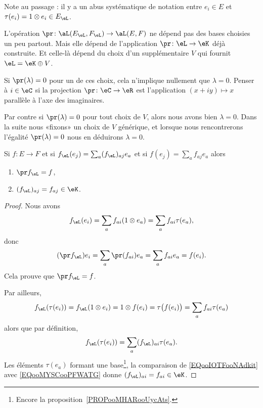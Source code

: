 Note au passage : il y a un abus systématique de notation entre \( e_i\in E\) et \( \tau(e_i)=1\otimes e_i\in E_{\eL}\).

\begin{remark}       \label{REMooBEXGooLgpHzg}
	L'opération \( \pr\colon \aL(E_{\eL},F_{\eL})\to \aL(E,F)\) ne dépend pas des bases choisies un peu partout. Mais elle dépend de l'application \( \pr\colon \eL\to \eK\) déjà construite. Et celle-là dépend du choix d'un supplémentaire \( V\) qui fournit \( \eL=\eK\oplus V\).

	Si \( \pr(\lambda)=0\) pour un de ces choix, cela n'implique nullement que \( \lambda=0\). Penser à \( i\in \eC\) si la projection \( \pr\colon \eC\to \eR\) est l'application \( (x+iy)\mapsto x\) parallèle à l'axe des imaginaires.

	Par contre si \( \pr(\lambda)=0\) pour tout choix de \( V\), alors nous avons bien \( \lambda=0\). Dans la suite nous «fixons» un choix de \( V\) générique, et lorsque nous rencontrerons l'égalité \( \pr(\lambda)=0\) nous en déduirons \( \lambda=0\).
\end{remark}

\begin{proposition} \label{PROPooPWDKooFNFWRI}
	Si \( f\colon E\to F\) et si \( f_{\eL}(e_j)=\sum_a(f_{\eL})_{aj}e_a\) et si \( f(e_j)=\sum_af_{aj}e_a\) alors
	\begin{enumerate}
		\item
		      \( \pr f_{\eL}=f\),
		\item       \label{ITEMooNMPYooXosGhI}
		      \( (f_{\eL})_{aj}=f_{aj} \in \eK\).
	\end{enumerate}
\end{proposition}

\begin{proof}
	Nous avons
	\begin{equation}
		f_{\eL}(e_i)=\sum_a f_{ai}(1\otimes e_a)=\sum_a f_{ai}\tau(e_a),
	\end{equation}
	donc
	\begin{equation}
		(\pr f_{\eL})e_i=\sum_a\pr(f_{ai})e_a=\sum_af_{ai}e_a=f(e_i).
	\end{equation}
	Cela prouve que \( \pr f_{\eL}=f\).

	Par ailleurs,
	\begin{equation}        \label{EQooIOTFooNAdkit}
		f_{\eL}(\tau (e_i))=f_{\eL}(1\otimes e_i)=1\otimes f(e_i)=\tau\big( f(e_i) \big)=\sum_af_{ai}\tau(e_a)
	\end{equation}
	alors que par définition,
	\begin{equation}        \label{EQooMYSCooPFWATG}
		f_{\eL}(\tau (e_i))=\sum_a(f_{\eL})_{ai}\tau(e_a).
	\end{equation}
	Les éléments \( \tau(e_a)\) formant une base\footnote{Encore la proposition~\ref{PROPooMHARooUycAts}.}, la comparaison de \eqref{EQooIOTFooNAdkit} avec \eqref{EQooMYSCooPFWATG} donne \( (f_{\eL})_{ai}=f_{ai}\in \eK\).
\end{proof}

